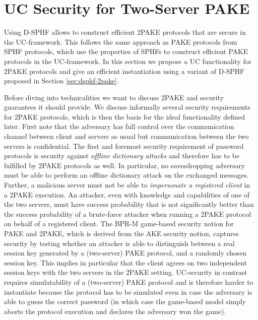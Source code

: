 \section{UC Security for Two-Server PAKE} \label{sec:uc2pake}


Using \acl{D-SPHF} allows to construct efficient \ac{2PAKE} protocols that are secure in the \ac{UC}-framework.
This follows the same approach as \ac{PAKE} protocols from \ac{SPHF} protocols, which use the properties of \acp{SPHF} to construct efficient \ac{PAKE} protocols in the \ac{UC}-framework.
In this section we propose a \ac{UC} functionality for \ac{2PAKE} protocols and give an efficient instantiation using a variant of \ac{D-SPHF} proposed in Section \ref{sec:dsphf-2pake}.

Before diving into technicalities we want to discuss \ac{2PAKE} and security guarantees it should provide.
We discuss informally several security requirements for \ac{2PAKE} protocols, which is then the basis for the ideal functionality \FTWOPAKE defined later.
First note that the adversary has full control over the communication channel between client and servers as usual but communication between the two servers is confidential.
The first and foremost security requirement of password protocols is security against \emph{offline dictionary attacks} and therefore has to be fulfilled by \ac{2PAKE} protocols as well.
In particular, no eavesdropping adversary must be able to perform an offline dictionary attack on the exchanged messages.
Further, a malicious server must not be able to \emph{impersonate a registered client} in a \ac{2PAKE} execution.
An attacker, even with knowledge and capabilities of one of the two servers, must have success probability that is not significantly better than the success probability of a brute-force attacker when running a \ac{2PAKE} protocol on behalf of a registered client.
The \ac{BPR-M} game-based security notion for \ac{PAKE} and \ac{2PAKE}, which is derived from the AKE security notion, captures security by testing whether an attacker is able to distinguish between a real session key generated by a (two-server) \ac{PAKE} protocol, and a randomly chosen session key.
This implies in particular that the client agrees on two independent session keys with the two servers in the \ac{2PAKE} setting.
\ac{UC}-security in contrast requires simulatability of a (two-server) \ac{PAKE} protocol and is therefore harder to instantiate because the protocol has to be simulated even in case the adversary is able to guess the correct password (in which case the game-based model simply aborts the protocol execution and declares the adversary won the game).

